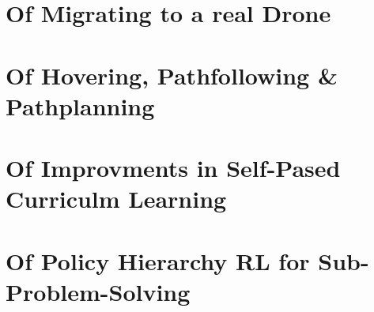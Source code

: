 \section{Of Migrating to a real Drone}

\newpage

\section{Of Hovering, Pathfollowing \& Pathplanning}

\newpage

\section{Of Improvments in Self-Pased Curriculm Learning}

\newpage

\section{Of Policy Hierarchy RL for Sub-Problem-Solving}

